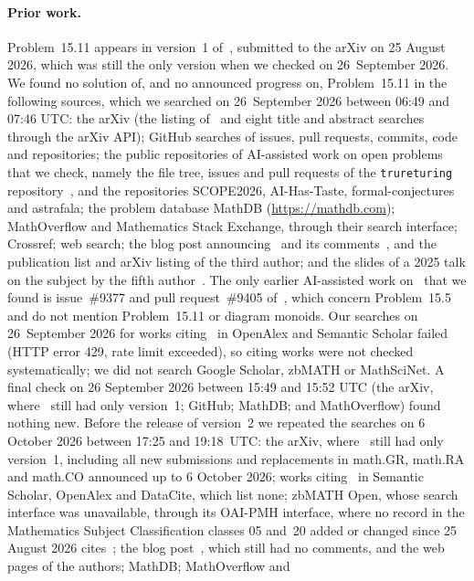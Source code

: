 \documentclass[11pt]{article}
\theoremstyle{remark}
\begin{document}
\paragraph{Prior work.}
Problem~15.11 appears in version~1 of~\cite{abchk}, submitted to the arXiv on
25 August 2026, which was still the only version when we checked on
26~September 2026. We found no solution of, and no announced progress on,
Problem~15.11 in the following sources, which we searched on 26~September 2026
between 06:49 and 07:46 UTC: the arXiv (the listing of~\cite{abchk} and eight
title and abstract searches through the arXiv API); GitHub searches of issues,
pull requests, commits, code and repositories; the public repositories of
AI-assisted work on open problems that we check, namely the file tree, issues
and pull requests of the \texttt{trureturing} repository~\cite{trurepo}, and
the repositories SCOPE2026, AI-Has-Taste, formal-conjectures and astrafala; the
problem database MathDB (\url{https://mathdb.com}); MathOverflow and Mathematics
Stack Exchange, through their search interface; Crossref; web search; the blog
post announcing~\cite{abchk} and its comments~\cite{camblog}, and the
publication list and arXiv listing of the third author; and the slides of a
2025 talk on the subject by the fifth author~\cite{kinyon}. The only earlier
AI-assisted work on~\cite{abchk} that we found is issue~\#9377 and pull
request~\#9405 of~\cite{trurepo}, which concern Problem~15.5 and do not mention
Problem~15.11 or diagram monoids. Our searches on 26~September 2026 for works
citing~\cite{abchk} in OpenAlex and Semantic Scholar failed (HTTP error 429,
rate limit exceeded), so citing works were not checked systematically; we did
not search Google Scholar, zbMATH or MathSciNet. A final check on 26 September
2026 between 15:49 and 15:52 UTC (the arXiv, where~\cite{abchk} still had only
version~1; GitHub; MathDB; and MathOverflow) found nothing new.
Before the release of version~2 we repeated the searches on 6 October 2026
between 17:25 and 19:18~UTC: the arXiv, where~\cite{abchk} still had only
version~1, including all new submissions and replacements in math.GR, math.RA
and math.CO announced up to 6 October 2026; works citing~\cite{abchk} in
Semantic Scholar, OpenAlex and DataCite, which list none; zbMATH Open, whose
search interface was unavailable, through its OAI-PMH interface, where no
record in the Mathematics Subject Classification classes 05 and~20 added or
changed since 25 August 2026 cites~\cite{abchk}; the blog post~\cite{camblog}, which still had no
comments, and the web pages of the authors; MathDB; MathOverflow and
\end{document}
